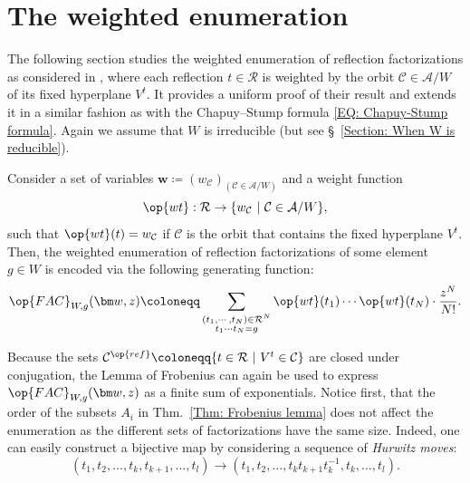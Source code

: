 \section{The weighted enumeration}
\label{Section: The weighted enumeration}

The following section studies the weighted enumeration of reflection factorizations as considered in \cite{reiner-delMas-Hameister}, where each reflection $t\in\mathcal{R}$ is weighted by the orbit $\mathcal{C}\in\mathcal{A}/W$ of its fixed hyperplane $V^t$. It provides a uniform proof of their result and extends it in a similar fashion as with the Chapuy--Stump formula \eqref{EQ: Chapuy-Stump formula}. Again we assume that $W$ is irreducible (but see \S~\ref{Section: When W is reducible}).

\begin{defi}\label{Defn: weight function}
Consider a set of variables $\bm w\coloneqq (w_{\mathcal{C}})_{(\mathcal{C}\in\mathcal{A}/W)}$ and a weight function $$\op{wt}:\mathcal{R}\rightarrow\{ w_{\mathcal{C}}\ |\ \mathcal{C}\in\mathcal{A}/W\},$$ such that $\op{wt}(t)=w_{\mathcal{C}}$ if $\mathcal{C}$ is the orbit that contains the fixed hyperplane $V^t$. Then, the weighted enumeration of reflection factorizations of some element $g\in W$ is encoded via the following generating function:
$$\op{FAC}_{W,g}(\bm w,z)\coloneqq \sum_{\substack{(t_1,\cdots,t_N)\in\mathcal{R}^N\\t_1\cdots t_N=g}}\op{wt}(t_1)\cdots\op{wt}(t_N)\cdot \dfrac{z^N}{N!}. $$
\end{defi}

Because the sets $\mathcal{C}^{\op{ref}}\coloneqq \{t\in\mathcal{R}\ |\ V^t\in\mathcal{C}\}$ are closed under conjugation, the Lemma of Frobenius can again be used to express $\op{FAC}_{W,g}(\bm w,z)$ as a finite sum of exponentials. Notice first, that the order of the subsets $A_i$ in Thm.~\ref{Thm: Frobenius lemma} does not affect the enumeration as the different sets of factorizations have the same size. Indeed, one can easily construct a bijective map by considering a sequence of {\it Hurwitz moves}:$$
(t_1,t_2,\ldots,t_k,t_{k+1},\ldots ,t_l)\rightarrow (t_1,t_2,\ldots,t_kt_{k+1}t_k^{-1},t_k,\ldots,t_l).$$  

